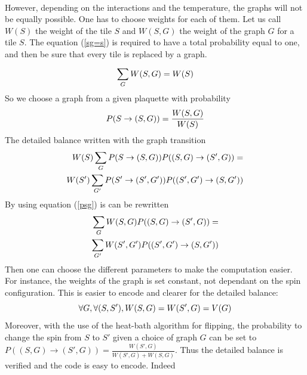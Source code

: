 \documentclass[a4paper,12pt,twoside]{article}
\begin{document}
{	\paragraph{}
	However, depending on the interactions and the temperature, the graphs will not be equally possible. One has to choose weights for each of them. Let us call $W(S)$ the weight of the tile $S$ and $W(S,G)$ the weight of the graph $G$ for a tile $S$. The equation (\ref{sg=s}) is required to have a total probability equal to one, and then be sure that every tile is replaced by a graph.
	\begin{equation}
		\centering
		\label{sg=s}
		\sum_{G}^{} W(S,G) = W(S)
	\end{equation}
	So we choose a graph from a given plaquette with probability
	\begin{equation}
		\centering
		P(S\rightarrow(S, G)) = \frac{W(S,G)}{W(S)}
		\label{psg}
	\end{equation}
	The detailed balance written with the graph transition
	\begin{equation}
		\begin{split}
			W(S)\sum_{G}P(S\rightarrow (S,G))P((S,G)\rightarrow(S',G))
			= \\ W(S') \sum_{G'} P(S'\rightarrow (S',G'))P((S',G')\rightarrow(S,G'))
		\end{split}
		\centering
	\end{equation}
	By using equation (\ref{psg}) is can be rewritten
	\begin{equation}
		\begin{split}
		\sum_{G}W(S,G)P((S,G)\rightarrow(S',G)) = \\ \sum_{G'}W(S',G')P((S',G')\rightarrow(S,G'))
		\end{split}
		\centering
	\end{equation}
	Then one can choose the different parameters to make the computation easier. For instance, the weights of the graph is set constant, not dependant on the spin configuration. This is easier to encode and clearer for the detailed balance:
	\begin{equation}
		\centering
		\forall G, \forall(S,S'), W(S,G) = W(S',G) = V(G) \label{indepG}
	\end{equation}
	 Moreover, with the use of the heat-bath algorithm for flipping, the probability to change the spin from $S$ to $S'$ given a choice of graph $G$ can be set to $P((S,G)\rightarrow(S',G)) = \frac{W(S',G)}{W(S',G) + W(S,G)}$. Thus the detailed balance is verified and the code is easy to encode. Indeed
}
\end{document}
